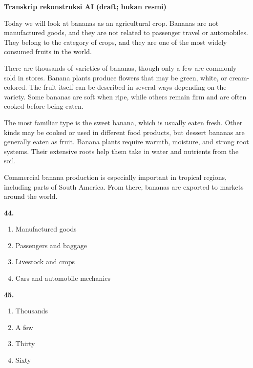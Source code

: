 \documentclass[12pt]{article}
\begin{document}
\par
\vspace{0.25\baselineskip}
\begin{exampleblock}
\textbf{Transkrip rekonstruksi AI (draft; bukan resmi)}\par
Today we will look at bananas as an agricultural crop. Bananas are not manufactured goods, and they are not related to passenger travel or automobiles. They belong to the category of crops, and they are one of the most widely consumed fruits in the world.\par
There are thousands of varieties of bananas, though only a few are commonly sold in stores. Banana plants produce flowers that may be green, white, or cream-colored. The fruit itself can be described in several ways depending on the variety. Some bananas are soft when ripe, while others remain firm and are often cooked before being eaten.\par
The most familiar type is the sweet banana, which is usually eaten fresh. Other kinds may be cooked or used in different food products, but dessert bananas are generally eaten as fruit. Banana plants require warmth, moisture, and strong root systems. Their extensive roots help them take in water and nutrients from the soil.\par
Commercial banana production is especially important in tropical regions, including parts of South America. From there, bananas are exported to markets around the world.\par
\end{exampleblock}
\noindent\textbf{44.}
\begin{enumerate}[label=(\Alph*),leftmargin=*,itemsep=0.2em]
\item Manufactured goods
\item Passengers and baggage
\item Livestock and crops
\item Cars and automobile mechanics
\end{enumerate}
\par
\vspace{0.25\baselineskip}
\noindent\textbf{45.}
\begin{enumerate}[label=(\Alph*),leftmargin=*,itemsep=0.2em]
\item Thousands
\item A few
\item Thirty
\item Sixty
\end{enumerate}
\par
\end{document}
